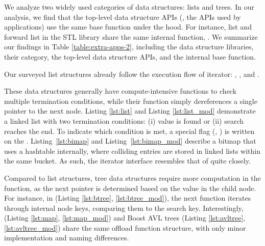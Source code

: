 We analyze two widely used categories of data structures: lists and trees. In our analysis, we find that the top-level data structure APIs (\ie, the APIs used by applications) use the same base function under the hood. For instance, list and forward list in the STL library share the same internal function, . We summarize our findings in Table \ref{table:extra-apps-2}, including the data structure libraries, their category, the top-level data structure APIs, and the internal base function.

 Our surveyed list structures already follow the execution flow of \pulse iterator: , , and .

These data structures generally have compute-intensive  functions to check multiple termination conditions, while their  function simply dereferences a single pointer to the next node. Listing \ref{lst:list} and Listing \ref{lst:list_mod} demonstrate a linked list with two termination conditions: (i) value is found or (ii) search reaches the end. To indicate which condition is met, a special flag (\eg, ) is written on the . Listing~\ref{lst:bimap} and Listing~\ref{lst:bimap_mod} describe a bitmap that uses a hashtable internally, where colliding entries are stored in linked lists within the same bucket. As such, the \pulse iterator interface resembles that of  quite closely.

Compared to list structures, tree data structures require more computation in the  function, as the next pointer is determined based on the value in the child node. For instance, in  (Listing \ref{lst:btree}, \ref{lst:btree_mod}), the next function iterates through internal node keys, comparing them to the search key. Interestingly,  (Listing \ref{lst:map}, \ref{lst:map_mod}) and Boost AVL trees (Listing \ref{lst:avltree}, \ref{lst:avltree_mod}) share the same offload function structure, with only minor implementation and naming differences.

